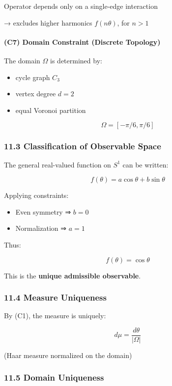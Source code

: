 \documentclass[
]{article}
\providecommand{\tightlist}{%
  \setlength{\itemsep}{0pt}\setlength{\parskip}{0pt}}
\begin{document}
Operator depends only on a single-edge interaction

→ excludes higher harmonics \(f(n\theta)\), for \(n > 1\)

\paragraph{(C7) Domain Constraint (Discrete
Topology)}\label{c7-domain-constraint-discrete-topology}

The domain \(\Omega\) is determined by:

\begin{itemize}
\tightlist
\item
  cycle graph \(C_3\)
\item
  vertex degree \(d = 2\)
\item
  equal Voronoi partition
\end{itemize}

\[
\Omega = [-\pi/6, \pi/6]
\]

\subsubsection{11.3 Classification of Observable
Space}\label{classification-of-observable-space}

The general real-valued function on \(S^1\) can be written:

\[
f(\theta) = a \cos\theta + b \sin\theta
\]

Applying constraints:

\begin{itemize}
\tightlist
\item
  Even symmetry ⇒ \(b = 0\)
\item
  Normalization ⇒ \(a = 1\)
\end{itemize}

Thus:

\[
f(\theta) = \cos\theta
\]

This is the \textbf{unique admissible observable}.

\subsubsection{11.4 Measure Uniqueness}\label{measure-uniqueness}

By (C1), the measure is uniquely:

\[
d\mu = \frac{d\theta}{|\Omega|}
\]

(Haar measure normalized on the domain)

\subsubsection{11.5 Domain Uniqueness}\label{domain-uniqueness}
\end{document}
